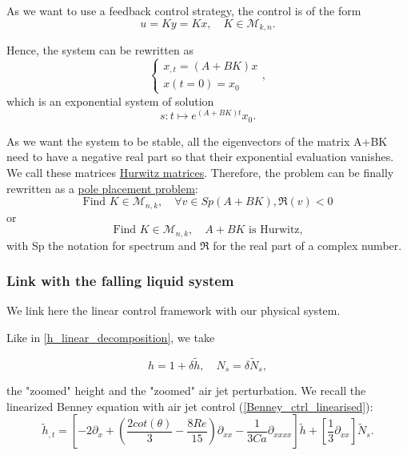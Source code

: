 \documentclass[12pt]{article}
\begin{document}
As we want to use a feedback control strategy, the control is of the form 
\begin{equation}
    u = Ky = Kx, \quad K \in \mathcal{M}_{k,n}.
\end{equation}

Hence, the system can be rewritten as 
\begin{equation}\label{expo_ctrl_system}
    \left\{
    \begin{aligned}
        x_{,t}=(A+BK)x \\
        x(t=0) = x_0
    \end{aligned}
    \right.,
\end{equation}
which is an exponential system of solution $$s:t\mapsto  e^{(A+BK)t}x_0.$$

As we want the system to be stable, all the eigenvectors of the matrix A+BK need to have a 
negative real part so that their exponential evaluation vanishes. We call these matrices \underline{Hurwitz matrices}. 
Therefore, the problem can be finally rewritten as a \underline{pole placement problem}: 
\begin{equation}\label{eq_pole_placement}
\boxed{
    \text{Find } K \in \mathcal{M}_{n,k},\quad \forall v \in Sp(A+BK), \mathfrak{R}(v) <0
    }
\end{equation}
or 
\begin{equation}\label{eq_pole_placement_Hurwitz}
    \text{Find } K \in \mathcal{M}_{n,k},\quad A+BK \text{ is Hurwitz,}
\end{equation}
with Sp the notation for spectrum and $\mathfrak{R}$ for the real part of a complex number.
\subsubsection{Link with the falling liquid system}\label{sub_section_link_ctr_FLF}
We link here the linear control framework with our physical system.

Like in  \eqref{h_linear_decomposition}, we take

\begin{equation*}
    h = 1+\delta \tilde{h},\quad N_s = \delta \tilde{N}_s, 
\end{equation*}

the "zoomed" height and the "zoomed" air jet perturbation. We recall the linearized Benney equation with air jet control (\ref{Benney_ctrl_linearised}):
$$\tilde{h}_{,t} = \left[ -2\partial_x + (\frac{2cot(\theta)}{3}-\frac{8Re}{15})\partial_{xx} - \frac{1}{3Ca}\partial_{xxxx}\right]\tilde{h} + \left[ \frac{1}{3}\partial_{xx}\right]\tilde{N}_s.$$
\\
\end{document}
